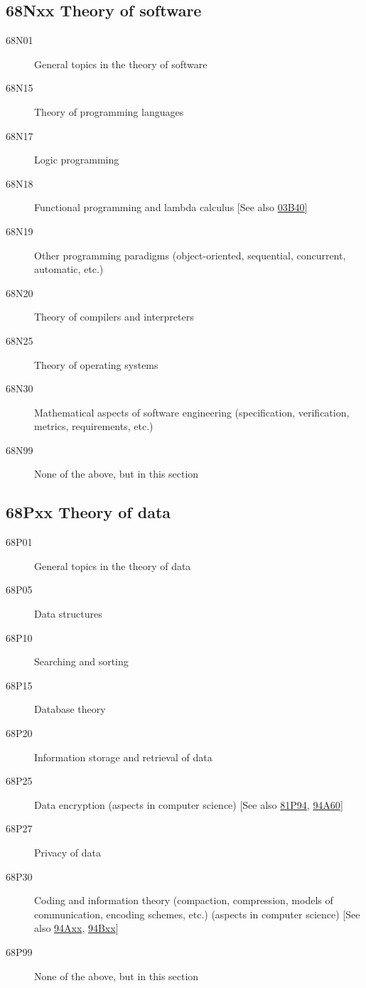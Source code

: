 \subsection*{68Nxx  Theory of software }\label{68Nxx}
\begin{description}
\item [68N01]\label{68N01} General topics in the theory of software
\item [68N15]\label{68N15} Theory of programming languages
\item [68N17]\label{68N17} Logic programming
\item [68N18]\label{68N18} Functional programming and lambda calculus [See also \hyperref[03B40]{03B40}]
\item [68N19]\label{68N19} Other programming paradigms (object-oriented, sequential, concurrent, automatic, etc.)
\item [68N20]\label{68N20} Theory of compilers and interpreters
\item [68N25]\label{68N25} Theory of operating systems
\item [68N30]\label{68N30} Mathematical aspects of software engineering (specification, verification, metrics, requirements, etc.)
\item [68N99]\label{68N99} None of the above, but in this section
\end{description}
\subsection*{68Pxx  Theory of data }\label{68Pxx}
\begin{description}
\item [68P01]\label{68P01} General topics in the theory of data
\item [68P05]\label{68P05} Data structures
\item [68P10]\label{68P10} Searching and sorting
\item [68P15]\label{68P15} Database theory
\item [68P20]\label{68P20} Information storage and retrieval of data
\item [68P25]\label{68P25} Data encryption (aspects in computer science) [See also \hyperref[81P94]{81P94}, \hyperref[94A60]{94A60}]
\item [68P27]\label{68P27} Privacy of data
\item [68P30]\label{68P30} Coding and information theory (compaction, compression, models of communication, encoding schemes, etc.) (aspects in computer science) [See also \hyperref[94Axx]{94Axx}, \hyperref[94Bxx]{94Bxx}]
\item [68P99]\label{68P99} None of the above, but in this section
\end{description}
